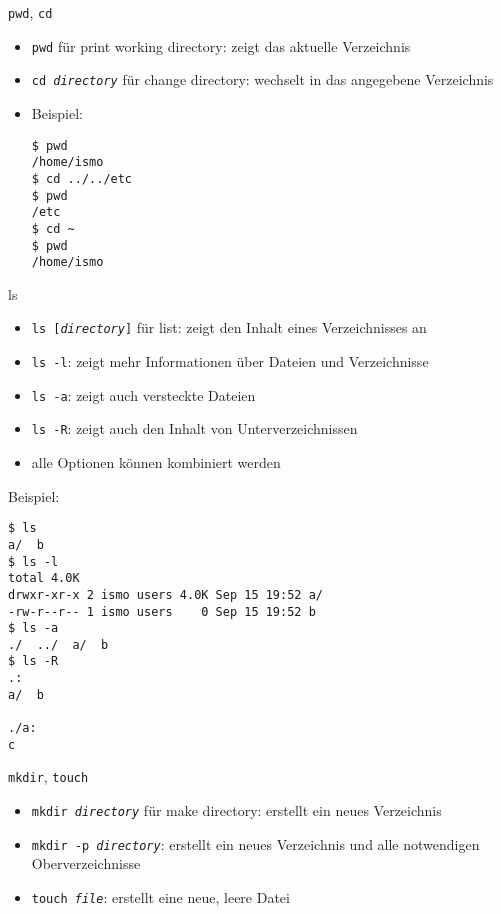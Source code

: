     \begin{frame}[fragile]{\texttt{pwd}, \texttt{cd}}
      \begin{itemize}
        \item \texttt{pwd} für print working directory: zeigt das aktuelle Verzeichnis
        \item \texttt{cd \textit{directory}} für change directory: wechselt in das angegebene Verzeichnis
        \item Beispiel:
\begin{verbatim}
$ pwd
/home/ismo
$ cd ../../etc
$ pwd
/etc
$ cd ~
$ pwd
/home/ismo
\end{verbatim}
      \end{itemize}
\end{frame}

    \begin{frame}{ls}
      \begin{itemize}
        \item \texttt{ls [\textit{directory}]} für list: zeigt den Inhalt eines Verzeichnisses an
        \item \texttt{ls -l}: zeigt mehr Informationen über Dateien und Verzeichnisse
        \item \texttt{ls -a}: zeigt auch versteckte Dateien
        \item \texttt{ls -R}: zeigt auch den Inhalt von Unterverzeichnissen
        \item alle Optionen können kombiniert werden
      \end{itemize}
    \end{frame}

    \begin{frame}[fragile]
      Beispiel:
\begin{verbatim}
$ ls
a/  b
$ ls -l
total 4.0K
drwxr-xr-x 2 ismo users 4.0K Sep 15 19:52 a/
-rw-r--r-- 1 ismo users    0 Sep 15 19:52 b
$ ls -a
./  ../  a/  b
$ ls -R
.:
a/  b

./a:
c
\end{verbatim}
\end{frame}

    \begin{frame}{\texttt{mkdir}, \texttt{touch}}
      \begin{itemize}
        \item \texttt{mkdir \textit{directory}} für make directory: erstellt ein neues Verzeichnis
        \item \texttt{mkdir -p \textit{directory}}: erstellt ein neues Verzeichnis und alle notwendigen Oberverzeichnisse
        \item \texttt{touch \textit{file}}: erstellt eine neue, leere Datei
      \end{itemize}
    \end{frame}

